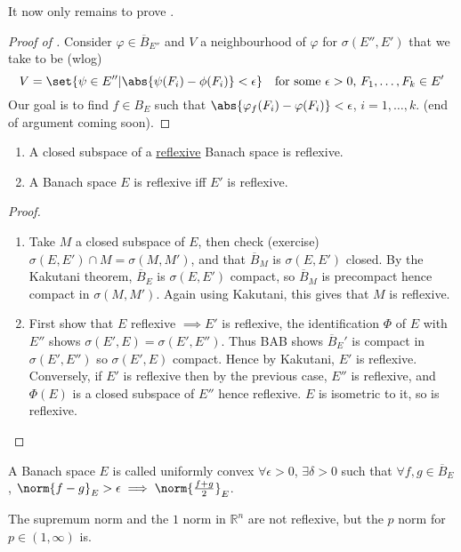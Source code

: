 \documentclass[twoside]{article}
\begin{document}
It now only remains to prove .
\begin{proof}[Proof of ]
    Consider $\varphi \in \overline{B}_{E''}$ and $V$ a neighbourhood of $\varphi$ for $\sigma(E'', E')$ that we take to be (wlog)
    \begin{equation*}
        V = \set{\psi \in E'' | \abs{\psi(F_i) - \phi(F_i)} < \epsilon} \quad \text{for some $\epsilon > 0$, $F_1, \dotsc, F_k \in E'$}
    \end{equation*}
    Our goal is to find $f \in B_E$ such that $\abs{\varphi_f(F_i) - \varphi(F_i)} < \epsilon$, $i = 1, \dotsc, k$.
    (end of argument coming soon).
\end{proof}

\begin{cor}\leavevmode
    \begin{enumerate}[label=(\roman*)]
        \item A closed subspace of a \hyperlink{def:refl}{reflexive} Banach space is reflexive.
        \item A Banach space $E$ is reflexive iff $E'$ is reflexive.
    \end{enumerate}
\end{cor}
\begin{proof}\leavevmode
    \begin{enumerate}[label=(\roman*)]
        \item Take $M$ a closed subspace of $E$, then check (exercise) $\sigma(E, E') \cap M = \sigma(M, M')$, and that $\overline{B}_M$ is $\sigma(E, E')$ closed.
            By the Kakutani theorem, $\overline{B}_E$ is $\sigma(E, E')$ compact, so $\overline{B}_M$ is precompact hence compact in $\sigma(M, M')$.
            Again using Kakutani, this gives that $M$ is reflexive.
        \item First show that $E$ reflexive $\implies E'$ is reflexive, the identification $\Phi$ of $E$ with $E''$ shows $\sigma(E', E) = \sigma(E', E'')$.
            Thus BAB shows $\overline{B}_E'$ is compact in $\sigma(E', E'')$ so $\sigma(E', E)$ compact. Hence by Kakutani, $E'$ is reflexive.
            Conversely, if $E'$ is reflexive then by the previous case, $E''$ is reflexive, and $\Phi(E)$ is a closed subspace of $E''$ hence reflexive.
            $E$ is isometric to it, so is reflexive.
    \end{enumerate}
\end{proof}

\begin{defi}
    A Banach space $E$ is called uniformly convex $\forall \epsilon > 0$, $\exists \delta > 0$ such that $\forall f, g \in \overline{B}_E$, $\norm{f-g}_E > \epsilon \implies \norm{\frac{f+g}{2}}_E$.
\end{defi}
\begin{eg}
  The supremum norm and the $1$ norm in $\mathbb{R}^n$ are not reflexive, but the $p$ norm for $p \in (1, \infty)$ is.
\end{eg}
\end{document}
